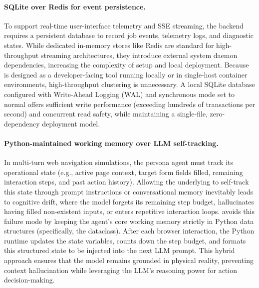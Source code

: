 \paragraph{SQLite over Redis for event persistence.}
To support real-time user-interface telemetry and SSE streaming, the backend requires a persistent database to record job events, telemetry logs, and diagnostic states. While dedicated in-memory stores like Redis are standard for high-throughput streaming architectures, they introduce external system daemon dependencies, increasing the complexity of setup and local deployment. Because \versimux{} is designed as a developer-facing tool running locally or in single-host container environments, high-throughput clustering is unnecessary. A local SQLite database configured with Write-Ahead Logging (WAL) and synchronous mode set to normal offers sufficient write performance (exceeding hundreds of transactions per second) and concurrent read safety, while maintaining a single-file, zero-dependency deployment model.

\paragraph{Python-maintained working memory over LLM self-tracking.}
In multi-turn web navigation simulations, the persona agent must track its operational state (e.g., active page context, target form fields filled, remaining interaction steps, and past action history). Allowing the underlying  to self-track this state through prompt instructions or conversational memory inevitably leads to cognitive drift, where the model forgets its remaining step budget, hallucinates having filled non-existent inputs, or enters repetitive interaction loops. \versimux{} avoids this failure mode by keeping the agent's core working memory strictly in Python data structures (specifically, the  dataclass). After each browser interaction, the Python runtime updates the state variables, counts down the step budget, and formats this structured state to be injected into the next LLM prompt. This hybrid approach ensures that the model remains grounded in physical reality, preventing context hallucination while leveraging the LLM's reasoning power for action decision-making.
